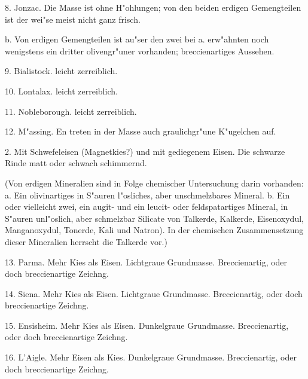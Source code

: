 \documentclass[a4paper, 11pt, oneside, polutonikogreek, german]{article}
\begin{document}
\hspace*{15mm}8. Jonzac. Die Masse ist ohne H"ohlungen; von den beiden erdigen Gemengteilen ist der wei"se meist nicht ganz frisch.

\vspace{2ex}

\hspace*{10mm}b. Von erdigen Gemengteilen ist au"ser den zwei bei a. erw"ahnten noch wenigstens ein dritter olivengr"uner vorhanden; breccienartiges Aussehen.

\hspace*{15mm}9. Bialistock. leicht zerreiblich.

\hspace*{15mm}10. Lontalax. leicht zerreiblich.

\hspace*{15mm}11. Nobleborough. leicht zerreiblich.

\hspace*{15mm}12. M"assing. En treten in der Masse auch graulichgr"une K"ugelchen auf.

\vspace{5ex}

2. Mit Schwefeleisen (Magnetkies?) und mit gediegenem Eisen. Die schwarze Rinde matt oder schwach schimmernd.

\vspace{2ex}

(Von erdigen Mineralien sind in Folge chemischer Untersuchung darin vorhanden: a. Ein olivinartiges in S"auren l"osliches, aber unschmelzbares Mineral. b. Ein oder vielleicht zwei, ein augit- und ein leucit- oder feldspatartiges Mineral, in S"auren unl"oslich, aber schmelzbar Silicate von Talkerde, Kalkerde, Eisenoxydul, Manganoxydul, Tonerde, Kali und Natron). In der chemischen Zusammensetzung dieser Mineralien herrscht die Talkerde vor.)

\vspace{2ex}

13. Parma. Mehr Kies als Eisen. Lichtgraue Grundmasse. Breccienartig, oder doch breccienartige Zeichng.

14. Siena. Mehr Kies als Eisen. Lichtgraue Grundmasse. Breccienartig, oder doch breccienartige Zeichng.

15. Ensisheim. Mehr Kies als Eisen. Dunkelgraue Grundmasse. Breccienartig, oder doch breccienartige Zeichng.

16. L'Aigle. Mehr Eisen als Kies. Dunkelgraue Grundmasse. Breccienartig, oder doch breccienartige Zeichng.
\end{document}
